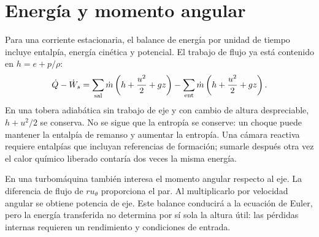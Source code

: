 \section{Energía y momento angular}
Para una corriente estacionaria, el balance de energía por unidad de tiempo incluye entalpía, energía cinética y potencial. El trabajo de flujo ya está contenido en $h=e+p/\rho$:
\begin{equation}
 \dot Q-\dot W_s=\sum_{\rm sal}\dot m\left(h+\frac{u^2}{2}+gz\right)
 -\sum_{\rm ent}\dot m\left(h+\frac{u^2}{2}+gz\right).
\end{equation}
En una tobera adiabática sin trabajo de eje y con cambio de altura despreciable, $h+u^2/2$ se conserva. No se sigue que la entropía se conserve: un choque puede mantener la entalpía de remanso y aumentar la entropía. Una cámara reactiva requiere entalpías que incluyan referencias de formación; sumarle después otra vez el calor químico liberado contaría dos veces la misma energía.

En una turbomáquina también interesa el momento angular respecto al eje. La diferencia de flujo de $r u_\theta$ proporciona el par. Al multiplicarlo por velocidad angular se obtiene potencia de eje. Este balance conducirá a la ecuación de Euler, pero la energía transferida no determina por sí sola la altura útil: las pérdidas internas requieren un rendimiento y condiciones de entrada.
